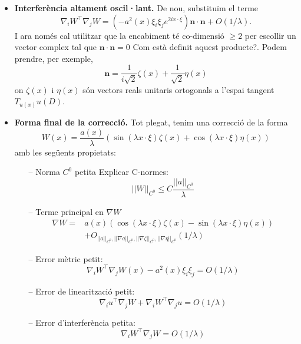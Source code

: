 \begin{itemize}
    \item \textbf{Interferència altament oscil·lant.} De nou, substituïm el terme
    \begin{equation*}
        \nabla_iW^{\intercal}\nabla_jW = (-a^2(x)\xi_i\xi_je^{2ix\cdot\xi})\textbf{n}\cdot\textbf{n} + O(1/\lambda).
    \end{equation*}
    I ara només cal utilitzar que la encabiment té co-dimensió $\ge2$ per escollir un vector complex tal que $\textbf{n}\cdot\textbf{n} = 0$ {\color{blue}Com està definit aquest producte?}. Podem prendre, per exemple, 
    \begin{equation*}
        \textbf{n} = \frac{1}{i\sqrt2}\zeta(x) + \frac{1}{\sqrt2}\eta(x)
    \end{equation*}
    on $\zeta(x)$ i $\eta(x)$ són vectors reals unitaris ortogonals a l'espai tangent $T_{u(x)}u(D)$.
    \item \textbf{Forma final de la correcció.} Tot plegat, tenim una correcció de la forma
    \begin{equation*}
        W(x) = \frac{a(x)}{\lambda}\left( \sin(\lambda x \cdot \xi)\zeta(x) + \cos(\lambda x \cdot \xi)\eta(x) \right)
    \end{equation*}
    amb les següents propietats:
    \begin{itemize}
        \item[--] Norma $C^0$ petita {\color{blue} Explicar C-normes}: $$||W||_{C^0}\le C\frac{||a||_{C^0}}{\lambda}$$
        \item[--] Terme principal en $\nabla W$ 
        \begin{equation*}
            \begin{aligned}
                \nabla W = &a(x)\left( \cos(\lambda x \cdot \xi)\zeta(x) - \sin(\lambda x \cdot \xi)\eta(x) \right) \\
                &+ O_{||a||_{C^0}, ||\nabla a||_{C^0}, ||\nabla\zeta||_{C^0}, ||\nabla\eta||_{C^0}}(1/\lambda)
            \end{aligned}
        \end{equation*}
        \item[--] Error mètric petit: $$\nabla_i W^{\intercal}\nabla_j W(x) -a^2(x)\xi_i\xi_j = O(1/\lambda)$$
        \item[--] Error de linearització petit: $$\nabla_i u ^{\intercal}\nabla_j W + \nabla_iW^{\intercal}\nabla_ju = O(1/\lambda)$$
        \item[--] Error d'interferència petita: $$\nabla_i W ^{\intercal}\nabla_j W = O(1/\lambda)$$
    \end{itemize}
\end{itemize}
